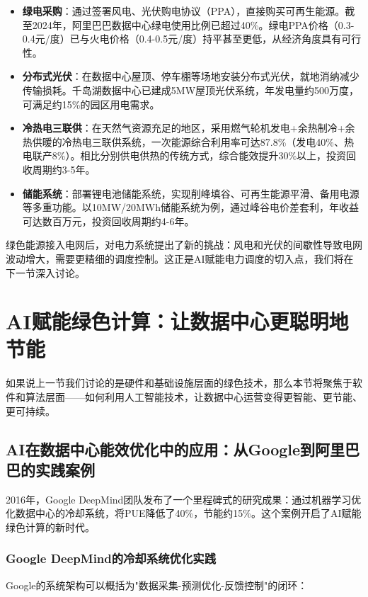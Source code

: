 \begin{itemize}
    \item \textbf{绿电采购}：通过签署风电、光伏购电协议（PPA），直接购买可再生能源。截至2024年，阿里巴巴数据中心绿电使用比例已超过40\%。绿电PPA价格（0.3-0.4元/度）已与火电价格（0.4-0.5元/度）持平甚至更低，从经济角度具有可行性。
    \item \textbf{分布式光伏}：在数据中心屋顶、停车棚等场地安装分布式光伏，就地消纳减少传输损耗。千岛湖数据中心已建成5MW屋顶光伏系统，年发电量约500万度，可满足约15\%的园区用电需求。
    \item \textbf{冷热电三联供}：在天然气资源充足的地区，采用燃气轮机发电+余热制冷+余热供暖的冷热电三联供系统，一次能源综合利用率可达87.8\%（发电40\%、热电联产8\%）。相比分别供电供热的传统方式，综合能效提升30\%以上，投资回收周期约3-5年。
    \item \textbf{储能系统}：部署锂电池储能系统，实现削峰填谷、可再生能源平滑、备用电源等多重功能。以10MW/20MWh储能系统为例，通过峰谷电价差套利，年收益可达数百万元，投资回收周期约4-6年。
\end{itemize}

绿色能源接入电网后，对电力系统提出了新的挑战：风电和光伏的间歇性导致电网波动增大，需要更精细的调度控制。这正是AI赋能电力调度的切入点，我们将在下一节深入讨论。

\section{AI赋能绿色计算：让数据中心更聪明地节能}\label{sec:ai-green-computing}

如果说上一节我们讨论的是硬件和基础设施层面的绿色技术，那么本节将聚焦于软件和算法层面——如何利用人工智能技术，让数据中心运营变得更智能、更节能、更可持续。

\subsection{AI在数据中心能效优化中的应用：从Google到阿里巴巴的实践案例}

2016年，Google DeepMind团队发布了一个里程碑式的研究成果：通过机器学习优化数据中心的冷却系统，将PUE降低了40\%，节能约15\%。这个案例开启了AI赋能绿色计算的新时代。

\subsubsection{Google DeepMind的冷却系统优化实践}

Google的系统架构可以概括为"数据采集-预测优化-反馈控制"的闭环：

